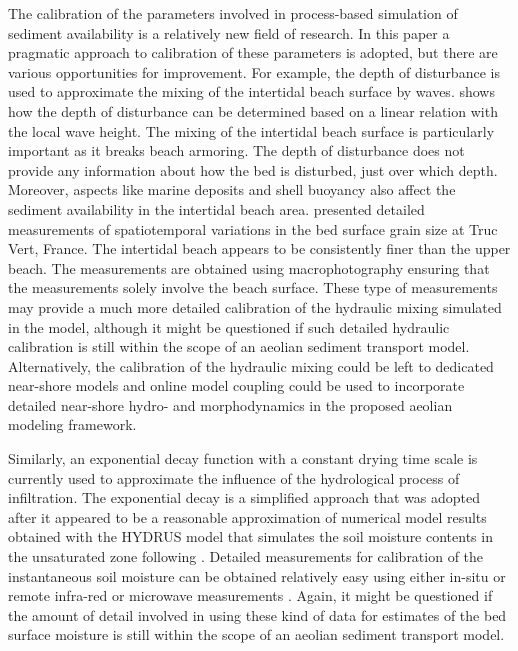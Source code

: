 The calibration of the parameters involved in process-based simulation
of sediment availability is a relatively new field of research. In
this paper a pragmatic approach to calibration of these parameters is
adopted, but there are various opportunities for improvement. For
example, the depth of disturbance is used to approximate the mixing of
the intertidal beach surface by waves. \citet{Masselink2007} shows how
the depth of disturbance can be determined based on a linear relation
with the local wave height. The mixing of the intertidal beach surface
is particularly important as it breaks beach armoring. The depth of
disturbance does not provide any information about how the bed is
disturbed, just over which depth. Moreover, aspects like marine
deposits and shell buoyancy also affect the sediment availability in
the intertidal beach area. \citet{Gallagher2011} presented detailed
measurements of spatiotemporal variations in the bed surface grain
size at Truc Vert, France. The intertidal beach appears to be
consistently finer than the upper beach. The measurements are obtained
using macrophotography \citep{Buscombe2010} ensuring that the
measurements solely involve the beach surface. These type of
measurements may provide a much more detailed calibration of the
hydraulic mixing simulated in the model, although it might be
questioned if such detailed hydraulic calibration is still within the
scope of an aeolian sediment transport model. Alternatively, the
calibration of the hydraulic mixing could be left to dedicated
near-shore models \citep[e.g. XBeach;][]{Roelvink2009,Reniers2013} and
online model coupling could be used to incorporate detailed near-shore
hydro- and morphodynamics in the proposed aeolian modeling framework.

Similarly, an exponential decay function with a constant drying
time scale is currently used to approximate the influence of the
hydrological process of infiltration. The exponential decay is a
simplified approach that was adopted after it appeared to be a
reasonable approximation of numerical model results obtained with the
HYDRUS model \citep{Simunek1998} that simulates the soil moisture
contents in the unsaturated zone following
\citet{Genuchten1978}. Detailed measurements for calibration of the
instantaneous soil moisture can be obtained relatively easy using
either in-situ or remote infra-red or microwave measurements
\citep[e.g.][]{Edwards2013, Hoonhout2014}. Again, it might be
questioned if the amount of detail involved in using these kind of
data for estimates of the bed surface moisture is still within the
scope of an aeolian sediment transport model.

